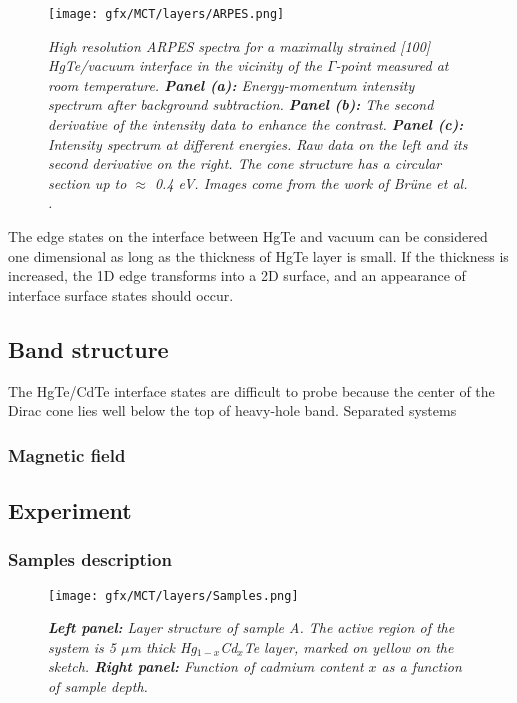 \documentclass[titlepage,a4paper]{book}
\newcommand{\wciecie}{\quad\phantom{v}}
\begin{document}
\begin{figure}[ht]
	\centering
	\texttt{[image: gfx/MCT/layers/ARPES.png]}
	\vspace{-10pt}
	\caption{\textit{High resolution ARPES spectra for a maximally strained [100] HgTe/vacuum interface in the vicinity of the $\Gamma$-point measured at room temperature. \textbf{Panel (a):} Energy-momentum intensity spectrum after background subtraction. \textbf{Panel (b):} The second derivative of the intensity data to enhance the contrast. \textbf{Panel (c):} Intensity spectrum at different energies. Raw data on the left and its second derivative on the right. The cone structure has a circular section up to $\approx$ 0.4 eV. Images come from the work of Brüne \textit{et al.} \cite{Brune_State2}.}}
	\label{fig:Layers_ARPES}
\end{figure} 

The edge states on the interface between HgTe and vacuum can be considered one dimensional as long as the thickness of HgTe layer is small. If the thickness is increased, the 1D edge transforms into a 2D surface, and an appearance of interface surface states should occur.

\subsection{Band structure}
The HgTe/CdTe interface states are difficult to probe because the center of the Dirac cone lies well below the top of heavy-hole band.
Separated systems

\subsubsection{Magnetic field}

\subsection{Experiment}
\subsubsection{Samples description}
\wciecie
\begin{figure}[ht]
	\centering
	\texttt{[image: gfx/MCT/layers/Samples.png]}
	\vspace{-10pt}
	\caption{\textit{\textbf{Left panel:} Layer structure of sample A. The active region of the system is 5 $\mu$m thick Hg$_{1-x}$Cd$_x$Te layer, marked on yellow on the sketch. \textbf{Right panel:} Function of cadmium content $x$ as a function of sample depth.}}
	\label{fig:Samples_layers}
\end{figure} 
\end{document}
